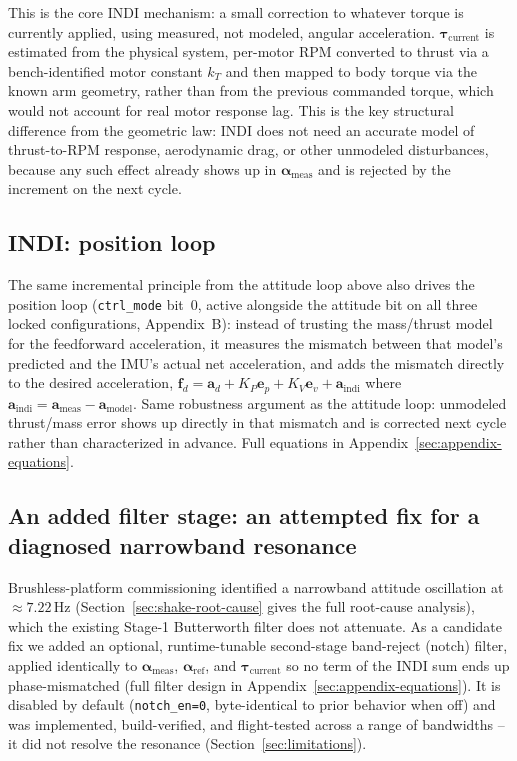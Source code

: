 \documentclass[11pt,a4paper]{article}
\newcommand{\code}[1]{\texttt{#1}}
\begin{document}
This is the core INDI mechanism: a small correction to whatever torque is currently applied,
using measured, not modeled, angular acceleration. $\boldsymbol{\tau}_{\mathrm{current}}$ is
estimated from the physical system, per-motor RPM converted to thrust via a bench-identified motor
constant $k_T$ and then mapped to body torque via the known arm geometry, rather than from the
previous commanded torque, which would not account for real motor response lag. This is the key
structural difference from the geometric law: INDI does not need an accurate model of
thrust-to-RPM response, aerodynamic drag, or other unmodeled disturbances, because any such effect
already shows up in $\boldsymbol{\alpha}_{\mathrm{meas}}$ and is rejected by the increment on the
next cycle.

\subsection{INDI: position loop}
\label{sec:indi-position-methods}

The same incremental principle from the attitude loop above also drives the position loop
(\code{ctrl\_mode} bit~0, active
alongside the attitude bit on all three locked configurations, Appendix~B): instead of trusting
the mass/thrust model for the feedforward acceleration, it measures the mismatch between that
model's predicted and the IMU's actual net acceleration, and adds the mismatch directly to the
desired acceleration, $\mathbf{f}_d = \mathbf{a}_d + K_P\mathbf{e}_p + K_V\mathbf{e}_v +
\mathbf{a}_{\mathrm{indi}}$ where $\mathbf{a}_{\mathrm{indi}}=\mathbf{a}_{\mathrm{meas}}-\mathbf{a}_{\mathrm{model}}$.
Same robustness argument as the attitude loop: unmodeled thrust/mass error shows up directly in
that mismatch and is corrected next cycle rather than characterized in advance. Full equations in
Appendix~\ref{sec:appendix-equations}.

\subsection{An added filter stage: an attempted fix for a diagnosed narrowband resonance}
\label{sec:notch-methods}

Brushless-platform commissioning identified a narrowband attitude oscillation at
$\approx7.22$\,Hz (Section~\ref{sec:shake-root-cause} gives the full root-cause analysis), which
the existing Stage-1 Butterworth filter does not attenuate. As a candidate fix we added an
optional, runtime-tunable second-stage band-reject (notch) filter, applied identically to
$\boldsymbol{\alpha}_{\mathrm{meas}}$, $\boldsymbol{\alpha}_{\mathrm{ref}}$, and
$\boldsymbol{\tau}_{\mathrm{current}}$ so no term of the INDI sum ends up phase-mismatched (full
filter design in Appendix~\ref{sec:appendix-equations}). It is disabled by default
(\code{notch\_en=0}, byte-identical to prior behavior when off) and was implemented,
build-verified, and flight-tested across a range of bandwidths -- it did not resolve the
resonance (Section~\ref{sec:limitations}).
\end{document}
